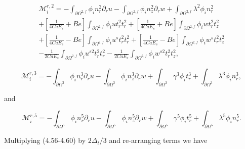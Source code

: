 \documentclass{article}
\begin{document}
\begin{equation}
\begin{array}{l} \mathcal{M}_i^{r,2} = -\int_{\partial \Omega^{2,f}} \phi_i n_r^2 \partial_r u - \int_{\partial \Omega^{2,f}} \phi_i n_z^2 \partial_r w + \int_{\partial \Omega^{2,f}} \lambda^2 \phi_i n_r^2 \\ + \left[ \frac{1}{4Ca E_s} + Be \right] \int_{\partial \Omega^{2,f}} \phi_i u t_r^2 t_r^2 + \left[ \frac{1}{4Ca E_s} + Be \right] \int_{\partial \Omega^{2,f}} \phi_i w t_r^2 t_z^2 \\ + \left[ \frac{1}{4Ca E_s} - Be \right] \int_{\partial \Omega^{2,f}} \phi_i u^s t_r^2 t_r^2 + \left[ \frac{1}{4Ca E_s} - Be \right] \int_{\partial \Omega^{2,f}} \phi_i w^s t_r^2 t_z^2 \\ - \frac{1}{2Ca E_s} \int_{\partial \Omega^{2,f}} \phi_i u^{s2} t_r^2 t_r^2 - \frac{1}{2Ca E_s} \int_{\partial \Omega^{2,f}} \phi_i w^{s2} t_r^2 t_z^2, \end{array} \tag{4.58}
\end{equation}

\begin{equation}
\mathcal{M}_i^{r,3} = -\int_{\partial \Omega^{3}} \phi_i n_r^3 \partial_r u - \int_{\partial \Omega^{3}} \phi_i n_z^3 \partial_r w + \int_{\partial \Omega^{3}} \gamma^3 \phi_i t_r^3 + \int_{\partial \Omega^{3}} \lambda^3 \phi_i n_r^3, \tag{4.59}
\end{equation}

and

\begin{equation}
\mathcal{M}_i^{r,5} = -\int_{\partial \Omega^{5}} \phi_i n_r^5 \partial_r u - \int_{\partial \Omega^{5}} \phi_i n_z^5 \partial_r w + \int_{\partial \Omega^{5}} \gamma^5 \phi_i t_r^5 + \int_{\partial \Omega^{5}} \lambda^5 \phi_i n_r^5. \tag{4.60}
\end{equation}

Multiplying (4.56-4.60) by \(2\Delta_t/3\) and re-arranging terms we have
\end{document}
